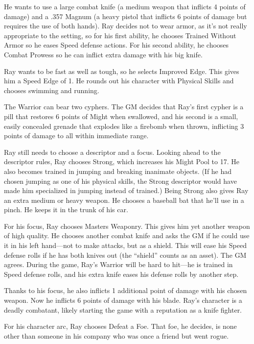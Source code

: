 He wants to use a large combat knife (a medium weapon that inflicts 4 points of damage) and a .357 Magnum (a heavy pistol that inflicts 6 points of damage but requires the use of both hands). Ray decides not to wear armor, as it’s not really appropriate to the setting, so for his first ability, he chooses Trained Without Armor so he eases Speed defense actions. For his second ability, he chooses Combat Prowess so he can inflict extra damage with his big knife. 

Ray wants to be fast as well as tough, so he selects Improved Edge. This gives him a Speed Edge of 1. He rounds out his character with Physical Skills and chooses swimming and running.

The Warrior can bear two cyphers. The GM decides that Ray’s first cypher is a pill that restores 6 points of Might when swallowed, and his second is a small, easily concealed grenade that explodes like a firebomb when thrown, inflicting 3 points of damage to all within immediate range. 

Ray still needs to choose a descriptor and a focus. Looking ahead to the descriptor rules, Ray chooses Strong, which increases his Might Pool to 17. He also becomes trained in jumping and breaking inanimate objects. (If he had chosen jumping as one of his physical skills, the Strong descriptor would have made him specialized in jumping instead of trained.) Being Strong also gives Ray an extra medium or heavy weapon. He chooses a baseball bat that he’ll use in a pinch. He keeps it in the trunk of his car.

For his focus, Ray chooses Masters Weaponry. This gives him yet another weapon of high quality. He chooses another combat knife and asks the GM if he could use it in his left hand—not to make attacks, but as a shield. This will ease his Speed defense rolls if he has both knives out (the “shield” counts as an asset). The GM agrees. During the game, Ray’s Warrior will be hard to hit—he is trained in Speed defense rolls, and his extra knife eases his defense rolls by another step.

Thanks to his focus, he also inflicts 1 additional point of damage with his chosen weapon. Now he inflicts 6 points of damage with his blade. Ray’s character is a deadly combatant, likely starting the game with a reputation as a knife fighter.

For his character arc, Ray chooses Defeat a Foe. That foe, he decides, is none other than someone in his company who was once a friend but went rogue.

